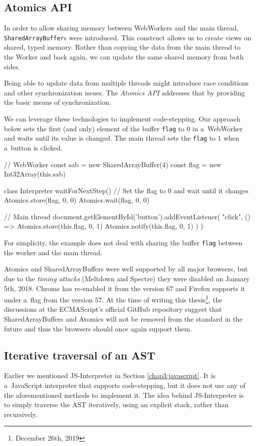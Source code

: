 \subsection*{Atomics API}
\label{chap4:atomics}
In order to allow sharing memory between WebWorkers and the main thread, \texttt{SharedArrayBuffer}s were introduced. This construct allows us to create
views on shared, typed memory. Rather than copying the data from the main thread to the Worker and back again, we can update the same shared memory from both sides.

Being able to update data from multiple threads might introduce race conditions and other synchronization issues. The \emph{Atomics API} addresses that by providing
the basic means of synchronization.

We can leverage these technologies to implement code-stepping. Our approach below sets the first (and only) element of the buffer \texttt{flag} to $0$ in a~WebWorker
and waits until its value is changed. The main thread sets the \texttt{flag} to $1$ when a~button is clicked.
\newpage
\begin{code}
// WebWorker
const sab = new SharedArrayBuffer(4)
const flag = new Int32Array(this.sab)

class Interpreter {
    waitForNextStep() {
        // Set the flag to 0 and wait until it changes
        Atomics.store(flag, 0, 0)
        Atomics.wait(flag, 0, 0)
    }
}

// Main thread
document.getElementById('button').addEventListener(
    "click",
    () => {
        Atomics.store(this.flag, 0, 1)
        Atomics.notify(this.flag, 0, 1)
    })
)
\end{code}
For simplicity, the example does not deal with sharing the buffer \texttt{flag} between the worker and the main thread.

Atomics and SharedArrayBuffers were well supported by all major browsers, but due to the \emph{timing attacks} (Meltdown and Spectre) they were disabled on
January 5th, 2018. Chrome has re-enabled it from the version $67$ and Firefox supports it under a~flag from the version $57$. At the time of
writing this thesis\footnote{December 26th, 2019}, the discussions at the ECMAScript's official GitHub repository suggest that SharedArrayBuffers and Atomics
will not be removed from the standard in the future and thus the browsers should once again support them.

\subsection*{Iterative traversal of an AST}
Earlier we mentioned JS-Interpreter \cite{JSInterpreter} in Section \ref{chap3:javascript}. It is a~JavaScript interpreter that supports code-stepping, but
it does not use any of the aforementioned methods to implement it. The idea behind JS-Interpreter is to simply traverse the AST iteratively, using an explicit
stack, rather than recursively.

